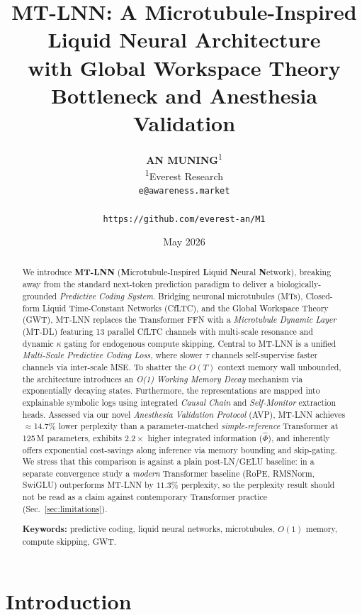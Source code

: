 \documentclass[11pt]{article}
\title{
  \textbf{MT-LNN: A Microtubule-Inspired Liquid Neural Architecture\\
  with Global Workspace Theory Bottleneck and Anesthesia Validation}
}
\author{
  \textbf{AN MUNING}\textsuperscript{1} \\
  \textsuperscript{1}Everest Research \\
  \texttt{e@awareness.market} \\
  \vspace{0.2cm} \\
  \texttt{https://github.com/everest-an/M1}
}
\date{May 2026}
\theoremstyle{definition}
\newcommand{\phihat}{\hat{\Phi}}
\begin{document}
\maketitle

\begin{abstract}
We introduce \textbf{MT-LNN} (\textbf{M}icro\textbf{t}ubule-Inspired \textbf{L}iquid \textbf{N}eural \textbf{N}etwork), breaking away from the standard next-token prediction paradigm to deliver a biologically-grounded \emph{Predictive Coding System}. Bridging neuronal microtubules (MTs), Closed-form Liquid Time-Constant Networks (CfLTC), and the Global Workspace Theory (GWT), MT-LNN replaces the Transformer FFN with a \emph{Microtubule Dynamic Layer} (MT-DL) featuring 13 parallel CfLTC channels with multi-scale resonance and dynamic $\kappa$ gating for endogenous compute skipping. Central to MT-LNN is a unified \emph{Multi-Scale Predictive Coding Loss}, where slower $\tau$ channels self-supervise faster channels via inter-scale MSE. To shatter the $O(T)$ context memory wall unbounded, the architecture introduces an \emph{O(1) Working Memory Decay} mechanism via exponentially decaying states. Furthermore, the representations are mapped into explainable symbolic logs using integrated \emph{Causal Chain} and \emph{Self-Monitor} extraction heads. Assessed via our novel \emph{Anesthesia Validation Protocol} (AVP), MT-LNN achieves $\approx$14.7\% lower perplexity than a parameter-matched \emph{simple-reference} Transformer at 125\,M parameters, exhibits $2.2\times$ higher integrated information ($\phihat$), and inherently offers exponential cost-savings along inference via memory bounding and skip-gating. We stress that this comparison is against a plain post-LN/GELU baseline: in a separate convergence study a \emph{modern} Transformer baseline (RoPE, RMSNorm, SwiGLU) outperforms MT-LNN by $11.3\%$ perplexity, so the perplexity result should not be read as a claim against contemporary Transformer practice (Sec.~\ref{sec:limitations}).

\medskip
\noindent\textbf{Keywords:} predictive coding, liquid neural networks, microtubules, $O(1)$ memory, compute skipping, GWT.
\end{abstract}

\section{Introduction}
\label{sec:intro}
\end{document}
